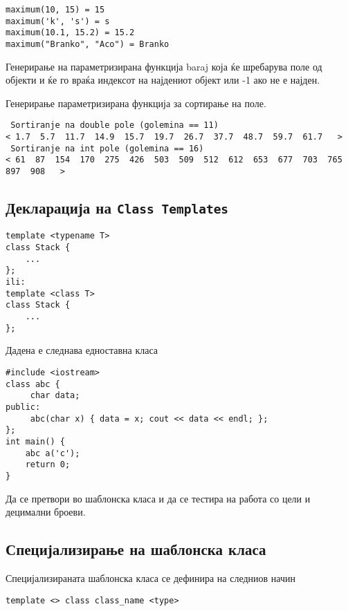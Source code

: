 

\begin{verbatim}
maximum(10, 15) = 15
maximum('k', 's') = s
maximum(10.1, 15.2) = 15.2
maximum("Branko", "Aco") = Branko
\end{verbatim}


Генерирање на параметризирана функција baraj која ќе шребарува поле од објекти и
ќе го враќа индексот на најдениот објект или -1 ако не е најден.




Генерирање параметризирана функција за сортирање на поле.



\begin{verbatim}
 Sortiranje na double pole (golemina == 11) 
< 1.7  5.7  11.7  14.9  15.7  19.7  26.7  37.7  48.7  59.7  61.7   >
 Sortiranje na int pole (golemina == 16) 
< 61  87  154  170  275  426  503  509  512  612  653  677  703  765  897  908   >
\end{verbatim}

\subsection{Декларација на \texttt{Class Templates}}
\begin{lstlisting}
template <typename T>
class Stack {
	...
};
ili:
template <class T>
class Stack {
	...
};
\end{lstlisting}

Дадена е следнава едноставна класа

\begin{lstlisting}
#include <iostream>
class abc {
     char data;
public:
     abc(char x) { data = x; cout << data << endl; };
};
int main() {
	abc a('c');
	return 0;
}
\end{lstlisting}
Да се претвори во шаблонска класа и да се тестира на работа со цели и децимални
броеви.



\subsection{Специјализирање на шаблонска класа}

Специјализираната шаблонска класа се дефинира на следниов начин

\begin{lstlisting}
template <> class class_name <type> 
\end{lstlisting}

